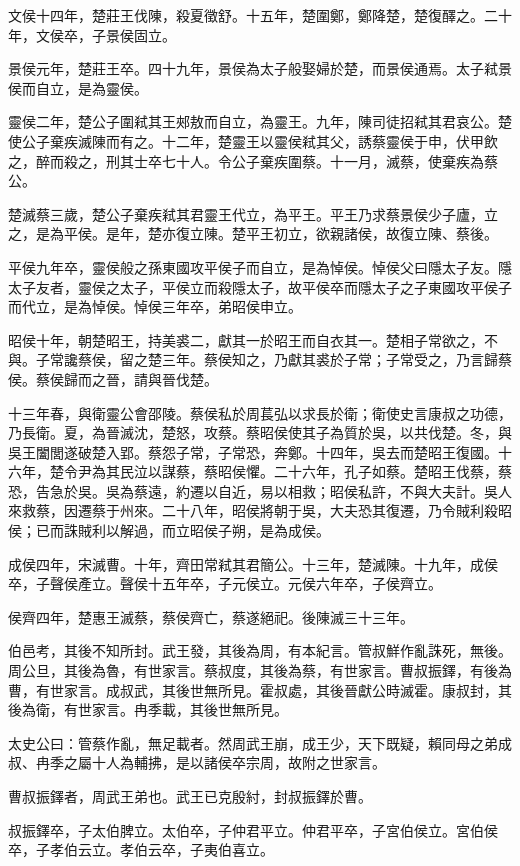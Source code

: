 \begin{pinyinscope}
文侯十四年，楚莊王伐陳，殺夏徵舒。十五年，楚圍鄭，鄭降楚，楚復醳之。二十年，文侯卒，子景侯固立。

景侯元年，楚莊王卒。四十九年，景侯為太子般娶婦於楚，而景侯通焉。太子弒景侯而自立，是為靈侯。

靈侯二年，楚公子圍弒其王郟敖而自立，為靈王。九年，陳司徒招弒其君哀公。楚使公子棄疾滅陳而有之。十二年，楚靈王以靈侯弒其父，誘蔡靈侯于申，伏甲飲之，醉而殺之，刑其士卒七十人。令公子棄疾圍蔡。十一月，滅蔡，使棄疾為蔡公。

楚滅蔡三歲，楚公子棄疾弒其君靈王代立，為平王。平王乃求蔡景侯少子廬，立之，是為平侯。是年，楚亦復立陳。楚平王初立，欲親諸侯，故復立陳、蔡後。

平侯九年卒，靈侯般之孫東國攻平侯子而自立，是為悼侯。悼侯父曰隱太子友。隱太子友者，靈侯之太子，平侯立而殺隱太子，故平侯卒而隱太子之子東國攻平侯子而代立，是為悼侯。悼侯三年卒，弟昭侯申立。

昭侯十年，朝楚昭王，持美裘二，獻其一於昭王而自衣其一。楚相子常欲之，不與。子常讒蔡侯，留之楚三年。蔡侯知之，乃獻其裘於子常；子常受之，乃言歸蔡侯。蔡侯歸而之晉，請與晉伐楚。

十三年春，與衛靈公會邵陵。蔡侯私於周萇弘以求長於衛；衛使史言康叔之功德，乃長衛。夏，為晉滅沈，楚怒，攻蔡。蔡昭侯使其子為質於吳，以共伐楚。冬，與吳王闔閭遂破楚入郢。蔡怨子常，子常恐，奔鄭。十四年，吳去而楚昭王復國。十六年，楚令尹為其民泣以謀蔡，蔡昭侯懼。二十六年，孔子如蔡。楚昭王伐蔡，蔡恐，告急於吳。吳為蔡遠，約遷以自近，易以相救；昭侯私許，不與大夫計。吳人來救蔡，因遷蔡于州來。二十八年，昭侯將朝于吳，大夫恐其復遷，乃令賊利殺昭侯；已而誅賊利以解過，而立昭侯子朔，是為成侯。

成侯四年，宋滅曹。十年，齊田常弒其君簡公。十三年，楚滅陳。十九年，成侯卒，子聲侯產立。聲侯十五年卒，子元侯立。元侯六年卒，子侯齊立。

侯齊四年，楚惠王滅蔡，蔡侯齊亡，蔡遂絕祀。後陳滅三十三年。

伯邑考，其後不知所封。武王發，其後為周，有本紀言。管叔鮮作亂誅死，無後。周公旦，其後為魯，有世家言。蔡叔度，其後為蔡，有世家言。曹叔振鐸，有後為曹，有世家言。成叔武，其後世無所見。霍叔處，其後晉獻公時滅霍。康叔封，其後為衛，有世家言。冉季載，其後世無所見。

太史公曰：管蔡作亂，無足載者。然周武王崩，成王少，天下既疑，賴同母之弟成叔、冉季之屬十人為輔拂，是以諸侯卒宗周，故附之世家言。

曹叔振鐸者，周武王弟也。武王已克殷紂，封叔振鐸於曹。

叔振鐸卒，子太伯脾立。太伯卒，子仲君平立。仲君平卒，子宮伯侯立。宮伯侯卒，子孝伯云立。孝伯云卒，子夷伯喜立。


\end{pinyinscope}
